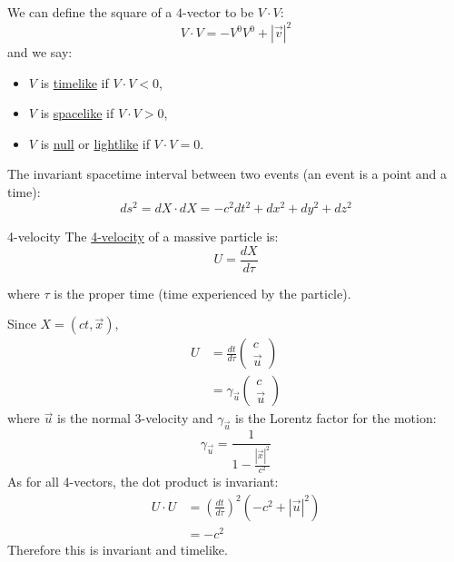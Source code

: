 \documentclass[../Main.tex]{subfiles}
\begin{document}
We can define the square of a $4$-vector to be $V \cdot V$:
\begin{equation*}
    V \cdot V = -V^0 V^0 + |\vec{v}|^2
\end{equation*}
and we say:
\begin{itemize}
    \item $V$ is \underline{timelike} if $V \cdot V < 0$,
    \item $V$ is \underline{spacelike} if $V \cdot V > 0$,
    \item $V$ is \underline{null} or \underline{lightlike} if $V \cdot V = 0$.
\end{itemize}
The invariant spacetime interval between two events (an event is a point and a time):
\begin{equation*}
    ds^2 = dX \cdot dX = -c^2 dt^2 + dx^2 + dy^2 + dz^2
\end{equation*}

\begin{definition}{4-velocity}
    The \underline{4-velocity} of a massive particle is:
    \begin{equation*}
        U = \frac{dX}{d\tau}
    \end{equation*}
\end{definition}
where $\tau$ is the proper time (time experienced by the particle).

Since $X = (ct, \vec{x})$,
\begin{align*}
    U &= \frac{dt}{d\tau} \begin{pmatrix}c \\ \vec{u}\end{pmatrix} \\
    &= \gamma_{\vec{u}} \begin{pmatrix}c \\ \vec{u}\end{pmatrix}    
\end{align*}
where $\vec{u}$ is the normal 3-velocity and $\gamma_{\vec{u}}$ is the Lorentz factor for the motion:
\begin{equation*}
    \gamma_{\vec{u}} = \frac{1}{1 - \frac{|\vec{x}|^2}{c^2}}
\end{equation*}
As for all 4-vectors, the dot product is invariant:
\begin{align*}
    U \cdot U &= \left(\frac{dt}{d\tau}\right)^2 (-c^2 + |\vec{u}|^2) \\
    &= -c^2
\end{align*}
Therefore this is invariant and timelike.
\end{document}
